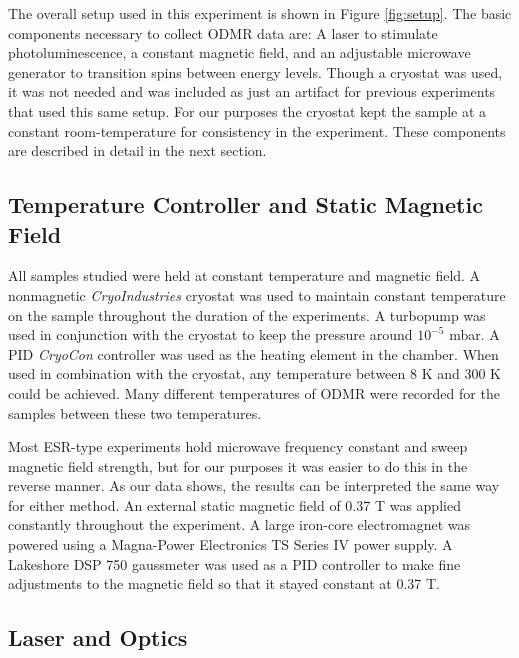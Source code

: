 \documentclass[oneside, astronomy, noacknowlegments]{BYUPhys}
\begin{document}
The overall setup used in this experiment is shown in Figure \ref{fig:setup}. The basic components necessary to collect ODMR data are: A laser to stimulate photoluminescence, a constant magnetic field, and an adjustable microwave generator to transition spins between energy levels. Though a cryostat was used, it was not needed and was included as just an artifact for previous experiments that used this same setup. For our purposes the cryostat kept the sample at a constant room-temperature for consistency in the experiment. These components are described in detail in the next section.

\subsection{Temperature Controller and Static Magnetic Field}

All samples studied were held at constant temperature and magnetic field. A nonmagnetic \textit{CryoIndustries} cryostat was used to maintain constant temperature on the sample throughout the duration of the experiments. A turbopump was used in conjunction with the cryostat to keep the pressure around $10^{-5}$ mbar. A PID \textit{CryoCon} controller was used as the heating element in the chamber. When used in combination with the cryostat, any temperature between 8 K and 300 K could be achieved. Many different temperatures of ODMR were recorded for the samples between these two temperatures.

Most ESR-type experiments hold microwave frequency constant and sweep magnetic field strength, but for our purposes it was easier to do this in the reverse manner. As our data shows, the results can be interpreted the same way for either method. An external static magnetic field of 0.37 T was applied constantly throughout the experiment. A large iron-core electromagnet was powered using a Magna-Power Electronics TS Series IV power supply. A Lakeshore DSP 750 gaussmeter was used as a PID controller to make fine adjustments to the magnetic field so that it stayed constant at 0.37 T.

\subsection{Laser and Optics}
\end{document}
